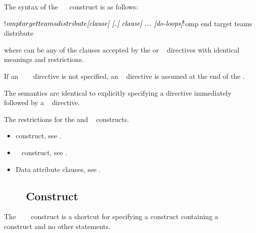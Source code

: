 \begin{fortranspecific}
The syntax of the ~~ construct is as follows:

\begin{ompfPragma}
!$omp target teams distribute \plc{[clause[ [},\plc{] clause] ... ]}
    \plc{do-loops}
\plc{[}!$omp end target teams distribute\plc{]}
\end{ompfPragma}

where  can be any of the clauses accepted by the  
or ~ directives with identical meanings and restrictions.

If an ~~~ directive is not 
specified, an ~   directive 
is assumed at the end of the .
\end{fortranspecific}

\descr
The semantics are identical to explicitly specifying a  directive 
immediately followed by a ~ directive.

\restrictions
The restrictions for the  and ~ constructs.

\crossreferences
\begin{itemize}
\item {} construct, see
.

\item {}~ construct, see
.

\item Data attribute clauses, see
.
\end{itemize}



\subsection{~~~ Construct}
\label{subsec:target teams distribute simd construct}
\summary
The ~~~ construct is a 
shortcut for specifying a  construct containing a 
~~ construct and no other statements.

